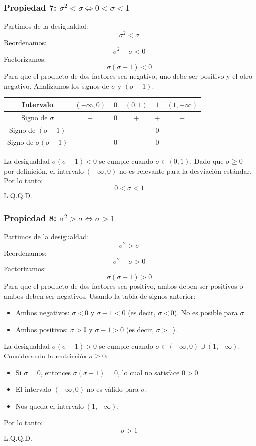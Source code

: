 \documentclass[12pt, letterpaper]{article}
\begin{document}
\subsubsection[Propiedad 7: sigma-cuadrado < sigma si y solo si 0 < sigma < 1]{Propiedad 7: $\sigma^2 < \sigma \iff 0 < \sigma < 1$}
Partimos de la desigualdad:
\[\sigma^2 < \sigma \]
Reordenamos:
\[\sigma^2-\sigma < 0 \]
Factorizamos:
\[\sigma(\sigma-1) < 0 \]
Para que el producto de dos factores sea negativo, uno debe ser positivo y el otro negativo. Analizamos los signos de $\sigma$ y $(\sigma-1)$:
\begin{center}
	\begin{tabular}{c|ccccc}
		Intervalo                   & $(-\infty, 0)$ & $0$ & $(0, 1)$ & $1$ & $(1, +\infty)$ \\
		\hline
		Signo de $\sigma$           & $-$            & $0$ & $+$      & $+$ & $+$            \\
		Signo de $(\sigma-1)$       & $-$            & $-$ & $-$      & $0$ & $+$            \\
		\hline
		Signo de $\sigma(\sigma-1)$ & $+$            & $0$ & $-$      & $0$ & $+$            \\
	\end{tabular}
\end{center}
La desigualdad $\sigma(\sigma-1) < 0$ se cumple cuando $\sigma \in (0, 1)$.
Dado que $\sigma \ge 0$ por definición, el intervalo $(-\infty, 0)$ no es relevante para la desviación estándar.
Por lo tanto:
\[0 < \sigma < 1 \]
L.Q.Q.D.

\subsubsection[Propiedad 8: sigma-cuadrado > sigma si y solo si sigma > 1]{Propiedad 8: $\sigma^2 > \sigma \iff \sigma > 1$}
Partimos de la desigualdad:
\[\sigma^2 > \sigma \]
Reordenamos:
\[\sigma^2-\sigma > 0 \]
Factorizamos:
\[\sigma(\sigma-1) > 0 \]
Para que el producto de dos factores sea positivo, ambos deben ser positivos o ambos deben ser negativos. Usando la tabla de signos anterior:
\begin{itemize}
	\item Ambos negativos: $\sigma < 0$ y $\sigma-1 < 0$ (es decir, $\sigma < 0$). No es posible para $\sigma$.
	\item Ambos positivos: $\sigma > 0$ y $\sigma-1 > 0$ (es decir, $\sigma > 1$).
\end{itemize}
La desigualdad $\sigma(\sigma-1) > 0$ se cumple cuando $\sigma \in (-\infty, 0) \cup (1, +\infty)$.
Considerando la restricción $\sigma \ge 0$:
\begin{itemize}
	\item Si $\sigma=0$, entonces $\sigma(\sigma-1)=0$, lo cual no satisface $0>0$.
	\item El intervalo $(-\infty,0)$ no es válido para $\sigma$.
	\item Nos queda el intervalo $(1, +\infty)$.
\end{itemize}
Por lo tanto:
\[\sigma > 1\]
L.Q.Q.D.
\newpage
\end{document}
